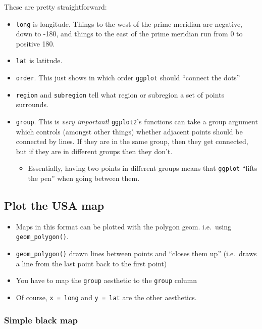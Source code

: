\documentclass[]{book}
\providecommand{\tightlist}{%
  \setlength{\itemsep}{0pt}\setlength{\parskip}{0pt}}
\theoremstyle{definition}
\theoremstyle{definition}
\theoremstyle{remark}
\begin{document}
These are pretty straightforward:

\begin{itemize}
\tightlist
\item
  \texttt{long} is longitude. Things to the west of the prime meridian
  are negative, down to -180, and things to the east of the prime
  meridian run from 0 to positive 180.
\item
  \texttt{lat} is latitude.
\item
  \texttt{order}. This just shows in which order \texttt{ggplot} should
  ``connect the dots''
\item
  \texttt{region} and \texttt{subregion} tell what region or subregion a
  set of points surrounds.
\item
  \texttt{group}. This is \emph{very important}! \texttt{ggplot2}'s
  functions can take a group argument which controls (amongst other
  things) whether adjacent points should be connected by lines. If they
  are in the same group, then they get connected, but if they are in
  different groups then they don't.

  \begin{itemize}
  \tightlist
  \item
    Essentially, having two points in different groups means that
    \texttt{ggplot} ``lifts the pen'' when going between them.
  \end{itemize}
\end{itemize}

\subsection{Plot the USA map}\label{plot-the-usa-map}

\begin{itemize}
\tightlist
\item
  Maps in this format can be plotted with the polygon geom. i.e.~using
  \texttt{geom\_polygon()}.
\item
  \texttt{geom\_polygon()} drawn lines between points and ``closes them
  up'' (i.e.~draws a line from the last point back to the first point)
\item
  You have to map the \texttt{group} aesthetic to the \texttt{group}
  column
\item
  Of course, \texttt{x\ =\ long} and \texttt{y\ =\ lat} are the other
  aesthetics.
\end{itemize}

\subsubsection{Simple black map}\label{simple-black-map}
\end{document}
